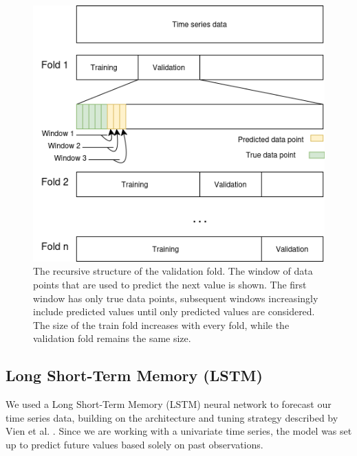 \documentclass[conference]{IEEEtran}
\begin{document}
\begin{figure}
    \includegraphics[scale = 0.47]{pictures/recursivecv.drawio.png}
    \caption{The recursive structure of the validation fold. The window of data points that are used 
    to predict the next value is shown. The first window has only true data points, subsequent windows
    increasingly include predicted values until only predicted values are considered. The size of the 
    train fold increases with every fold, while the validation fold remains the same size.}
    \label{fig:recursivecv}
\end{figure}



\subsection{Long Short-Term Memory (LSTM)}
We used a Long Short-Term Memory (LSTM) neural network to forecast our time series data, building on 
the architecture and tuning strategy described by Vien et al. \cite{kuen2021machine}. Since we are working 
with a univariate time series, the model was set up to predict future values based solely on past 
observations.
\end{document}
